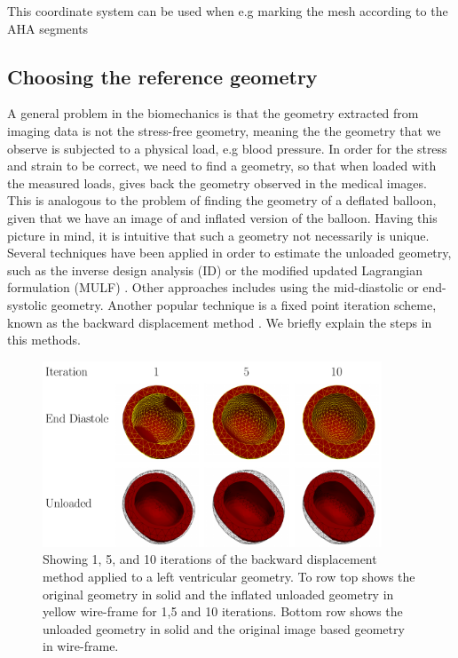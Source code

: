 This coordinate system can be used when e.g marking the mesh according
to the AHA segments

\subsection{Choosing the reference geometry}
\label{sef:reference_geometry}


A general problem in the biomechanics is that the geometry extracted from
imaging data is not the stress-free geometry, meaning the the geometry
that we observe is subjected to a physical load, e.g blood
pressure. In order for the stress and strain to be correct, we need to
find a geometry, so that when loaded with the measured loads, gives
back the geometry observed in the medical images. 
This is analogous to the problem of finding the geometry of a deflated balloon, given
that we have an image of and inflated version of the balloon. Having this picture in mind, it is
intuitive that such a geometry not necessarily is unique.
Several techniques have been applied in order to estimate the unloaded
geometry, such as the inverse design analysis (ID)
\cite{govindjee1996computational} or the modified updated Lagrangian
formulation (MULF) \cite{gee2010computational}. Other approaches
includes using the mid-diastolic or end-systolic geometry. Another popular
technique is a fixed point iteration scheme,  known as the
backward displacement method \cite{bols2013computational}. We briefly
explain the steps in this methods.

\begin{figure}[htbp]
  \centering
    \includegraphics[width=0.9\textwidth]{chapters/introduction/figures/unloading/canvas.pdf}
\caption{Showing 1, 5, and 10 iterations of the backward displacement
  method applied to a left ventricular geometry. To row top shows the
  original geometry in solid and the inflated unloaded geometry in
  yellow wire-frame for 1,5 and 10 iterations. Bottom row shows the
  unloaded geometry in solid and the original image based geometry in wire-frame.}
\label{fig:unloading_lv}
\end{figure}


